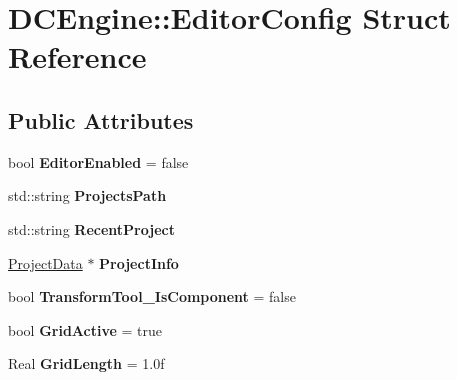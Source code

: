 \hypertarget{structDCEngine_1_1EditorConfig}{\section{D\-C\-Engine\-:\-:Editor\-Config Struct Reference}
\label{structDCEngine_1_1EditorConfig}
}
\subsection*{Public Attributes}
\begin{DoxyCompactItemize}
\item 
\hypertarget{structDCEngine_1_1EditorConfig_a6673d34f14085628272bc45c74d100a9}{bool {\bfseries Editor\-Enabled} = false}\label{structDCEngine_1_1EditorConfig_a6673d34f14085628272bc45c74d100a9}

\item 
\hypertarget{structDCEngine_1_1EditorConfig_a79d8b0bed86f101b8b54c072568b612b}{std\-::string {\bfseries Projects\-Path}}\label{structDCEngine_1_1EditorConfig_a79d8b0bed86f101b8b54c072568b612b}

\item 
\hypertarget{structDCEngine_1_1EditorConfig_a1b6418550561b8db513fea41bc1faefd}{std\-::string {\bfseries Recent\-Project}}\label{structDCEngine_1_1EditorConfig_a1b6418550561b8db513fea41bc1faefd}

\item 
\hypertarget{structDCEngine_1_1EditorConfig_abbeeb1c7ee0d81a338460620674578e4}{\hyperlink{structDCEngine_1_1ProjectData}{Project\-Data} $\ast$ {\bfseries Project\-Info}}\label{structDCEngine_1_1EditorConfig_abbeeb1c7ee0d81a338460620674578e4}

\item 
\hypertarget{structDCEngine_1_1EditorConfig_aa88e7643159c990361b3f5f394757e26}{bool {\bfseries Transform\-Tool\-\_\-\-Is\-Component} = false}\label{structDCEngine_1_1EditorConfig_aa88e7643159c990361b3f5f394757e26}

\item 
\hypertarget{structDCEngine_1_1EditorConfig_affc7f48fdc3bbfbb25d0012bd594b08a}{bool {\bfseries Grid\-Active} = true}\label{structDCEngine_1_1EditorConfig_affc7f48fdc3bbfbb25d0012bd594b08a}

\item 
\hypertarget{structDCEngine_1_1EditorConfig_a2865ccb9dea3df3a0f28d4afc479c55c}{Real {\bfseries Grid\-Length} = 1.\-0f}\label{structDCEngine_1_1EditorConfig_a2865ccb9dea3df3a0f28d4afc479c55c}


\end{DoxyCompactItemize}
